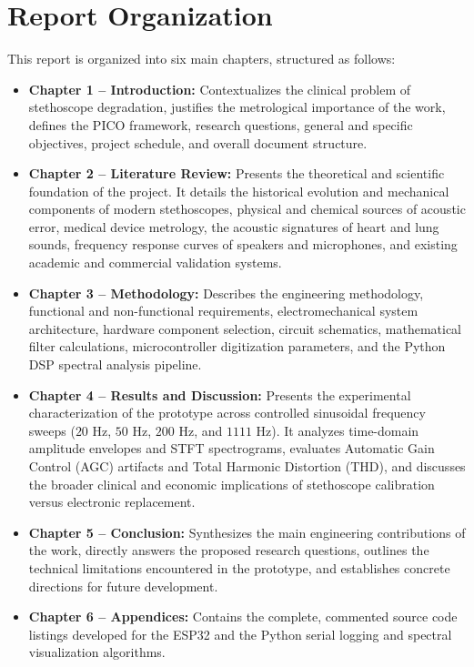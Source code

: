 \section{Report Organization}

This report is organized into six main chapters, structured as follows:

\begin{itemize}
    \item \textbf{Chapter 1 -- Introduction:} Contextualizes the clinical problem of stethoscope degradation, justifies the metrological importance of the work, defines the PICO framework, research questions, general and specific objectives, project schedule, and overall document structure.
    \item \textbf{Chapter 2 -- Literature Review:} Presents the theoretical and scientific foundation of the project. It details the historical evolution and mechanical components of modern stethoscopes, physical and chemical sources of acoustic error, medical device metrology, the acoustic signatures of heart and lung sounds, frequency response curves of speakers and microphones, and existing academic and commercial validation systems.
    \item \textbf{Chapter 3 -- Methodology:} Describes the engineering methodology, functional and non-functional requirements, electromechanical system architecture, hardware component selection, circuit schematics, mathematical filter calculations, microcontroller digitization parameters, and the Python DSP spectral analysis pipeline.
    \item \textbf{Chapter 4 -- Results and Discussion:} Presents the experimental characterization of the prototype across controlled sinusoidal frequency sweeps ($20\text{ Hz}$, $50\text{ Hz}$, $200\text{ Hz}$, and $1111\text{ Hz}$). It analyzes time-domain amplitude envelopes and STFT spectrograms, evaluates Automatic Gain Control (AGC) artifacts and Total Harmonic Distortion (THD), and discusses the broader clinical and economic implications of stethoscope calibration versus electronic replacement.
    \item \textbf{Chapter 5 -- Conclusion:} Synthesizes the main engineering contributions of the work, directly answers the proposed research questions, outlines the technical limitations encountered in the prototype, and establishes concrete directions for future development.
    \item \textbf{Chapter 6 -- Appendices:} Contains the complete, commented source code listings developed for the ESP32 and the Python serial logging and spectral visualization algorithms.
\end{itemize}




